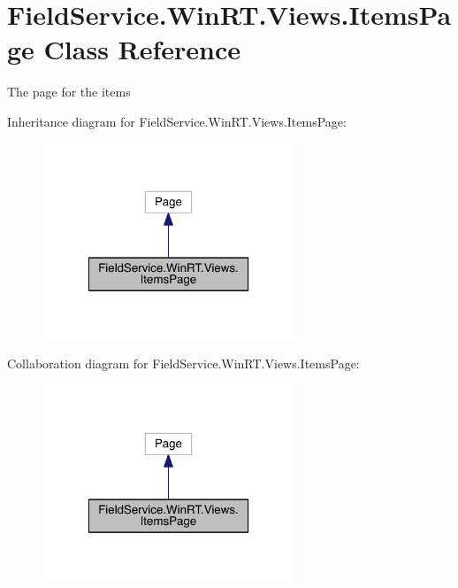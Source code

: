 \hypertarget{class_field_service_1_1_win_r_t_1_1_views_1_1_items_page}{\section{Field\+Service.\+Win\+R\+T.\+Views.\+Items\+Page Class Reference}
\label{class_field_service_1_1_win_r_t_1_1_views_1_1_items_page}
}


The page for the items  




Inheritance diagram for Field\+Service.\+Win\+R\+T.\+Views.\+Items\+Page\+:
\nopagebreak
\begin{figure}[H]
\begin{center}
\leavevmode
\includegraphics[width=214pt]{class_field_service_1_1_win_r_t_1_1_views_1_1_items_page__inherit__graph}
\end{center}
\end{figure}


Collaboration diagram for Field\+Service.\+Win\+R\+T.\+Views.\+Items\+Page\+:
\nopagebreak
\begin{figure}[H]
\begin{center}
\leavevmode
\includegraphics[width=214pt]{class_field_service_1_1_win_r_t_1_1_views_1_1_items_page__coll__graph}
\end{center}
\end{figure}
